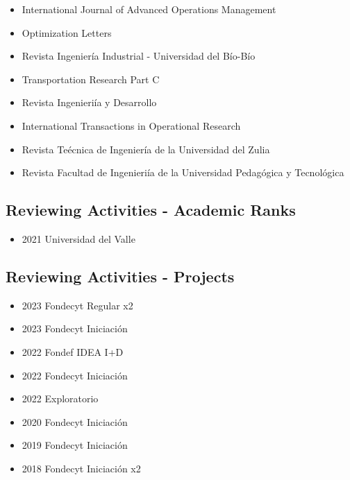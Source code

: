 {\begin{itemize}
\item International Journal of Advanced Operations Management
\item Optimization Letters
\item Revista Ingenier\'ia Industrial - Universidad del B\'io-B\'io
\item Transportation Research Part C
\end{itemize}
}

{\begin{itemize}
\item Revista Ingenieri\'ia y Desarrollo
\item International Transactions in Operational Research
\item Revista Te\'ecnica de Ingenier\'ia de la Universidad del Zulia
\end{itemize}
}

{\begin{itemize}
\item Revista Facultad de Ingenieri\'ia de la Universidad Pedag\'ogica y Tecnol\'ogica
\end{itemize}
}
\clearpage

\subsection{Reviewing Activities - Academic Ranks}

{\begin{itemize}
\item 2021 Universidad del Valle
\end{itemize}
}

\subsection{Reviewing Activities - Projects}

{\begin{itemize}
\item 2023 Fondecyt Regular x2
\item 2023 Fondecyt Iniciaci\'on
\item 2022 Fondef IDEA I+D
\item 2022 Fondecyt Iniciaci\'on
\item 2022 Exploratorio
\item 2020 Fondecyt Iniciaci\'on
\item 2019 Fondecyt Iniciaci\'on
\item 2018 Fondecyt Iniciaci\'on x2
\end{itemize}
}

